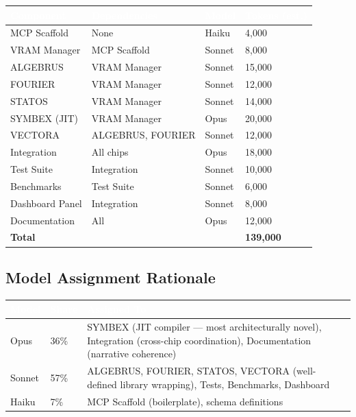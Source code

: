 \documentclass[11pt,letterpaper]{article}
\newcommand{\tableheader}[1]{\textbf{\sffamily\textcolor{white}{#1}}}
\begin{document}
\begin{center}
\begin{tabularx}{\textwidth}{L{3cm}L{2.5cm}C{1.5cm}C{1.8cm}}
\toprule
{}
\tableheader{Component} & \tableheader{Dependencies} & \tableheader{Model} & \tableheader{Tokens (est.)} \\
\midrule
MCP Scaffold & None & Haiku & 4,000 \\
VRAM Manager & MCP Scaffold & Sonnet & 8,000 \\
ALGEBRUS & VRAM Manager & Sonnet & 15,000 \\
FOURIER & VRAM Manager & Sonnet & 12,000 \\
STATOS & VRAM Manager & Sonnet & 14,000 \\
SYMBEX (JIT) & VRAM Manager & Opus & 20,000 \\
VECTORA & ALGEBRUS, FOURIER & Sonnet & 12,000 \\
Integration & All chips & Opus & 18,000 \\
Test Suite & Integration & Sonnet & 10,000 \\
Benchmarks & Test Suite & Sonnet & 6,000 \\
Dashboard Panel & Integration & Sonnet & 8,000 \\
Documentation & All & Opus & 12,000 \\
\midrule
\textbf{Total} & & & \textbf{139,000} \\
\bottomrule
\end{tabularx}
\end{center}

\subsection{Model Assignment Rationale}

\begin{center}
\begin{tabularx}{\textwidth}{C{1.5cm}C{1.5cm}X}
\toprule
{}
\tableheader{Model} & \tableheader{Share} & \tableheader{Assigned To} \\
\midrule
Opus & 36\% & SYMBEX (JIT compiler --- most architecturally novel), Integration (cross-chip coordination), Documentation (narrative coherence) \\
Sonnet & 57\% & ALGEBRUS, FOURIER, STATOS, VECTORA (well-defined library wrapping), Tests, Benchmarks, Dashboard \\
Haiku & 7\% & MCP Scaffold (boilerplate), schema definitions \\
\bottomrule
\end{tabularx}
\end{center}
\end{document}
